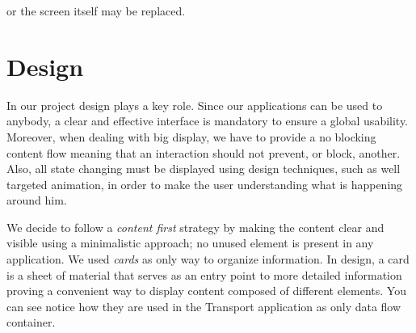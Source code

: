 \documentclass[]{usiinfbachelorproject}
\begin{document}
or the screen itself may be replaced. 
\section{Design}
In our project design plays a key role. Since our applications can be used to anybody, a clear and effective interface is mandatory to ensure a global usability. Moreover, when dealing with big display, we have to provide a no blocking content flow meaning that an interaction should not prevent, or block, another. Also, all state changing must be displayed using design techniques, such as well targeted animation, in order to make the user understanding what is happening around him.

We decide to follow a \emph{content first} strategy by making the content clear and visible using a minimalistic approach; no unused element is present in any application. We used \emph{cards} as only way to organize information. In design, a card is a sheet of material that serves as an entry point to more detailed information proving a convenient way to display content composed of different elements.
You can see notice how they are used in the Transport application as only data flow container.
\end{document}
